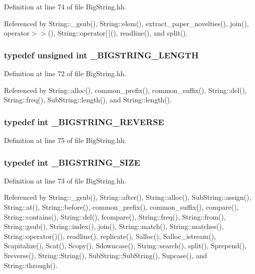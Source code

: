 Definition at line 74 of file Big\-String.hh.

Referenced by String::\_\-gsub(), String::elem(), extract\_\-paper\_\-novelties(), join(), operator$>$$>$(), String::operator[$\,$](), readline(), and split().
\subsubsection{\setlength{\rightskip}{0pt plus 5cm}typedef unsigned int \_\-BIGSTRING\_\-LENGTH}\label{BigString_8hh_a8}




Definition at line 72 of file Big\-String.hh.

Referenced by String::alloc(), common\_\-prefix(), common\_\-suffix(), String::del(), String::freq(), Sub\-String::length(), and String::length().
\subsubsection{\setlength{\rightskip}{0pt plus 5cm}typedef int \_\-BIGSTRING\_\-REVERSE}\label{BigString_8hh_a11}




Definition at line 75 of file Big\-String.hh.
\subsubsection{\setlength{\rightskip}{0pt plus 5cm}typedef int \_\-BIGSTRING\_\-SIZE}\label{BigString_8hh_a9}




Definition at line 73 of file Big\-String.hh.

Referenced by String::\_\-gsub(), String::after(), String::alloc(), Sub\-String::assign(), String::at(), String::before(), common\_\-prefix(), common\_\-suffix(), compare(), String::contains(), String::del(), fcompare(), String::freq(), String::from(), String::gsub(), String::index(), join(), String::match(), String::matches(), String::operator()(), readline(), replicate(), Salloc(), Salloc\_\-istream(), Scapitalize(), Scat(), Scopy(), Sdowncase(), String::search(), split(), Sprepend(), Sreverse(), String::String(), Sub\-String::Sub\-String(), Supcase(), and String::through().
